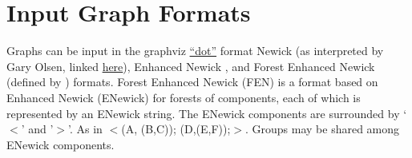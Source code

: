 \documentclass[11pt]{book}
\newcommand{\phyg}{\texttt{PhyG} }
\begin{document}
{{		%
%	
	\section{Input Graph Formats}
	Graphs can be input in the graphviz \href{https://graphviz.org/}{``dot''} format Newick (as 		
	interpreted by Gary Olsen, linked \href{https://evolution.genetics.washington.edu/phylip/newick_doc.html}
	{here}), Enhanced Newick \cite{Cardonaetal2008}, and Forest Enhanced Newick (defined by 
	\citealp{WheelerPhyloSuperGraphs}) formats.
	Forest Enhanced Newick (FEN) is a format based on Enhanced Newick (ENewick) for 
	forests of components, each of which is represented by an ENewick string. The ENewick 
	components are surrounded by `$<$' and '$>$'. As in $<$(A, (B,C)); (D,(E,F));$>$. 
	Groups may be shared among ENewick components.
	
}}
\end{document}
